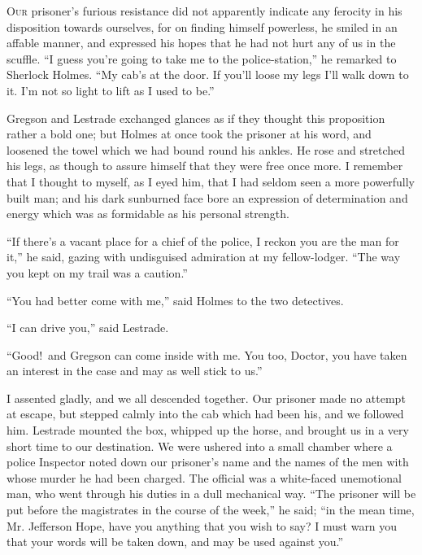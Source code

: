 \documentclass[12pt,english,oneside]{book}
\begin{document}


\lettrine[lines=2]{O}{ur} prisoner's furious resistance did not apparently indicate any
ferocity in his disposition towards ourselves, for on finding himself
powerless, he smiled in an affable manner, and expressed his hopes
that he had not hurt any of us in the scuffle. {}``I guess you're
going to take me to the police-station,'' he remarked to Sherlock
Holmes. {}``My cab's at the door. If you'll loose my legs I'll walk
down to it. I'm not so light to lift as I used to be.''

Gregson and Lestrade exchanged glances as if they thought this proposition
rather a bold one; but Holmes at once took the prisoner at his word,
and loosened the towel which we had bound round his ankles. He rose
and stretched his legs, as though to assure himself that they were
free once more. I remember that I thought to myself, as I eyed him,
that I had seldom seen a more powerfully built man; and his dark sunburned
face bore an expression of determination and energy which was as formidable
as his personal strength.

{}``If there's a vacant place for a chief of the police, I reckon
you are the man for it,'' he said, gazing with undisguised admiration
at my fellow-lodger. {}``The way you kept on my trail was a caution.''

{}``You had better come with me,'' said Holmes to the two detectives.

{}``I can drive you,'' said Lestrade.

{}``Good!\ and Gregson can come inside with me. You too, Doctor,
you have taken an interest in the case and may as well stick to us.''

I assented gladly, and we all descended together. Our prisoner made
no attempt at escape, but stepped calmly into the cab which had been
his, and we followed him. Lestrade mounted the box, whipped up the
horse, and brought us in a very short time to our destination. We
were ushered into a small chamber where a police Inspector noted down
our prisoner's name and the names of the men with whose murder he
had been charged. The official was a white-faced unemotional man,
who went through his duties in a dull mechanical way. {}``The prisoner
will be put before the magistrates in the course of the week,'' he
said; {}``in the mean time, Mr. Jefferson Hope, have you anything
that you wish to say? I must warn you that your words will be taken
down, and may be used against you.''
\end{document}
